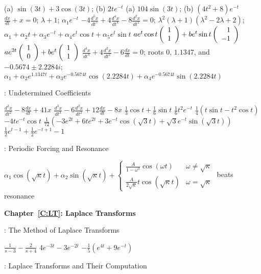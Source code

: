  \ans (a) $\sin(3t)+3\cos(3t)$; (b) $2te^{-t}$
 \ans (a) $104\sin(3t)$; (b) $(4t^2+8)e^{-t}$
 \ans $\frac{dx}{dt} + x = 0$; $\lambda + 1$; $\alpha_1e^{-t}$
 \ans $-4\frac{d^5x}{dt^5} + 4\frac{d^4x}{dt^4} - 
8\frac{d^2x}{dt^2} = 0$; $\lambda^2(\lambda + 1)(\lambda^2 - 2\lambda + 2)$; 
$\alpha_1 + \alpha_2 t + \alpha_3e^{-t} + \alpha_4e^t\cos t + \alpha_5e^t\sin t$
  \ans $ae^t\cos t\left(\begin{array}{r} 1 \\ 1\end{array}\right) + be^t\sin t\left(\begin{array}{r} 1 \\ -1\end{array}\right)$
 \ans $ae^{2t}\left(\begin{array}{r} 1 \\ 0\end{array}\right) + be^t\left(\begin{array}{r} 1 \\ 1\end{array}\right)$
 \ans $\frac{d^4x}{dt^4}+4\frac{d^2x}{dt^2}-6\frac{dx}{dt} = 0$;
roots $0$, $1.1347$, and $-0.5674 \pm 2.2284i$; $\alpha_1 + \alpha_2e^{1.1347t} 
+ \alpha_3e^{-0.5674t}\cos(2.2284t) + \alpha_4e^{-0.5674t}\sin(2.2284t)$



: Undetermined Coefficients

 \ans $\frac{d^2x}{dt^2} - 8\frac{dx}{dt} + 41x$
 \ans $\frac{d^3x}{dt^3} - 6\frac{d^2x}{dt^2} + 
12\frac{dx}{dt} - 8x$
 \ans $\frac{1}{3}\cos t + \frac{1}{6}\sin t$
 \ans $\frac{1}{6}t^2e^{-t}$
 \ans $\frac{1}{4}(t\sin t- t^2\cos t)$
 \ans $-4te^{-t}\cos t$
 \ans $\frac{1}{72}(-3e^{2t} + 6te^{2t} + 
3e^{-t}\cos(\sqrt{3}t) + \sqrt{3}e^{-t}\sin(\sqrt{3}t))$
 \ans $\frac{1}{2}e^{t - 1} + \frac{1}{2}e^{-t + 1} - 1$


: Periodic Forcing and Resonance

 \ans 
$\alpha_1\cos(\sqrt{\kappa}t) + \alpha_2\sin(\sqrt{\kappa}t)
+ \left\{
\begin{array}{lr} \frac{A}{1 - \omega^2}\cos(\omega t) &
\omega \neq \sqrt{\kappa} \\
\frac{A}{2\sqrt{\kappa}}t\cos(\sqrt{\kappa}t) &
\omega = \sqrt{\kappa}
\end{array}\right.$
 \ans beats
 \ans resonance


\vspace{0.08in}
{\bf Chapter~\ref{C:LT}: Laplace Transforms}

: The Method of Laplace Transforms

 \ans $\frac{1}{s-3} -\frac{2}{s+4}$
 \ans $4e^{-3t}-3e^{-2t}$
 \ans $-\frac{1}{5}(e^{4t}+9e^{-t})$

: Laplace Transforms and Their Computation

